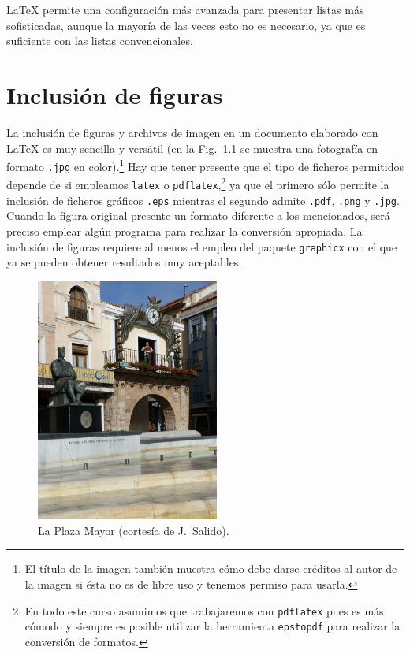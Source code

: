 \documentclass[ 		%
	11pt,				%
	a4paper,			%
	twoside,			%
	openright,			%
	final       		%
]{book}
\begin{document}
\LaTeX{} permite una configuración más avanzada para presentar listas más sofisticadas, aunque la mayoría de las veces esto no es necesario, ya que es suficiente con las listas convencionales.











\chapter{Inclusión de figuras}
La inclusión de figuras y archivos de imagen en un documento elaborado con \LaTeX{} es muy sencilla y versátil (en la Fig.~\ref{fig:plazaCR} se muestra una fotografía en formato \texttt{.jpg} en color).\footnote{El título de la imagen también muestra cómo debe darse créditos al autor de la imagen si ésta no es de libre uso y tenemos permiso para usarla.} Hay que tener presente que el tipo de ficheros permitidos depende de si empleamos \texttt{latex} o \texttt{pdflatex},\footnote{En todo este curso asumimos que trabajaremos con \texttt{pdflatex} pues es más cómodo y siempre es posible utilizar la herramienta \texttt{epstopdf} para realizar la conversión de formatos.} ya que el primero sólo permite la inclusión de ficheros gráficos \texttt{.eps} mientras el segundo admite \texttt{.pdf}, \texttt{.png} y \texttt{.jpg}. Cuando la figura original presente un formato diferente a los mencionados, será preciso emplear algún programa para realizar la conversión apropiada. La inclusión de figuras requiere al menos el empleo del paquete \texttt{graphicx} con el que ya se pueden obtener resultados muy aceptables.

\begin{figure}[hbt] %
	\centering %
	\includegraphics[height=8cm]{plazaCR} %
	\caption[Ejemplo de foto en formato jpg]{La Plaza Mayor (cortesía de J.~Salido).} %
	\label{fig:plazaCR} %
\end{figure}
\end{document}
